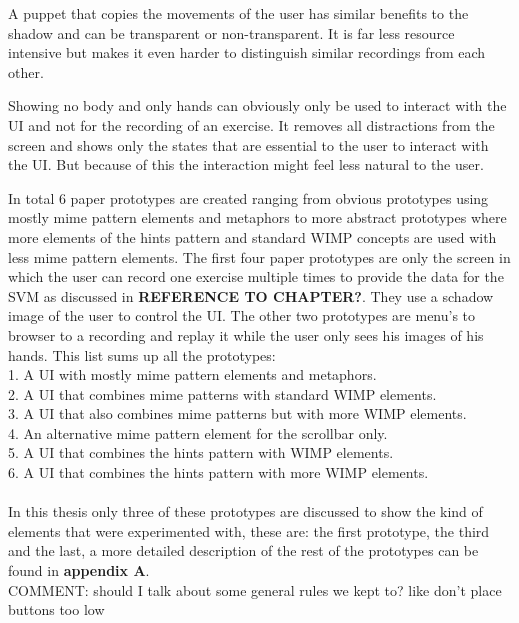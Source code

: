  
 A puppet that copies the movements of the user has similar benefits to the shadow and can be transparent or non-transparent. It is far less resource intensive but makes it even harder to distinguish similar recordings from each other.
 
 Showing no body and only hands can obviously only be used to interact with the UI and not for the recording of an exercise. It removes all distractions from the screen and shows only the states that are essential to the user to interact with the UI. But because of this the interaction might feel less natural to the user.
 
In total 6 paper prototypes are created ranging from obvious prototypes using mostly mime pattern elements and metaphors to more abstract prototypes where more elements of the hints pattern and standard WIMP concepts are used with less mime pattern elements. 
The first four paper prototypes are only the screen in which the user can record one exercise multiple times to provide the data for the SVM as discussed in \textbf{REFERENCE TO CHAPTER?}. They use a schadow image of the user to control the UI. The other two prototypes are menu's to browser to a recording and replay it while the user only sees his images of his hands. This list sums up all the prototypes: \\

1. A UI with mostly mime pattern elements and metaphors. \\
2. A UI that combines mime patterns with standard WIMP elements. \\
3. A UI that also combines mime patterns but with more WIMP elements. \\
4. An alternative mime pattern element for the scrollbar only. \\
5. A UI that combines the hints pattern with WIMP elements. \\
6. A UI that combines the hints pattern with more WIMP elements.\\ \\

In this thesis only three of these prototypes are discussed to show the kind of elements that were experimented with, these are: the first prototype, the third and the last, a more detailed description of the rest of the prototypes can be found in \textbf{appendix A}.\\

{\large COMMENT: should I talk about some general rules we kept to? like don't place buttons too low}

